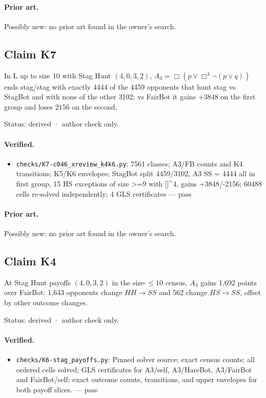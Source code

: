 \documentclass{article}
\begin{document}
\paragraph{Prior art.} Possibly new: no prior art found in the owner's search.

\subsection*{Claim K7}

In L up to size 10 with Stag Hunt $(4,0,3,2)$, $A_3=\Box(p\lor\Box^3\neg(p\lor q))$ ends stag/stag with exactly 4444 of the 4459 opponents that hunt stag vs StagBot and with none of the other 3102; vs FairBot it gains $+3848$ on the first group and loses $2156$ on the second.

Status: derived · author check only.

\paragraph{Verified.}
\begin{itemize}
\item \texttt{checks/K7-c046\_xreview\_k4k6.py}: 7561 classes; A3/FB counts and K4 transitions; K5/K6 envelopes; StagBot split 4459/3102, A3 SS = 4444 all in first group, 15 HS exceptions of size \textgreater{}=9 with []\textasciicircum{}4, gains +3848/-2156; 60488 cells re-solved independently; 4 GLS certificates --- pass
\end{itemize}

\paragraph{Prior art.} Possibly new: no prior art found in the owner's search.

\subsection*{Claim K4}

At Stag Hunt payoffs $(4,0,3,2)$ in the size-$\le10$ census, $A_3$ gains 1,692 points over FairBot: 1,643 opponents change $HH\to SS$ and 562 change $HS\to SS$, offset by other outcome changes.

Status: derived · author check only.

\paragraph{Verified.}
\begin{itemize}
\item \texttt{checks/K6-stag\_payoffs.py}: Pinned solver source; exact census counts; all ordered cells solved; GLS certificates for A3/self, A3/HareBot, A3/FairBot and FairBot/self; exact outcome counts, transitions, and upper envelopes for both payoff slices. --- pass
\end{itemize}
\end{document}
